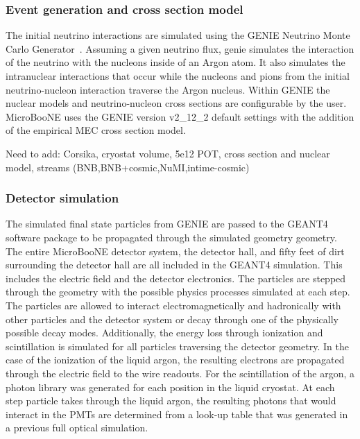   \subsubsection{Event generation and cross section model}
    The initial neutrino interactions are simulated using the GENIE Neutrino
    Monte Carlo Generator~\cite{Andreopoulos:2009rq,Andreopoulos:2015wxa}.
    Assuming a given neutrino flux, genie simulates the interaction of the
    neutrino with the nucleons inside of an Argon atom. It also simulates the
    intranuclear interactions that occur while the nucleons and pions from the
    initial neutrino-nucleon interaction traverse the Argon nucleus.  Within
    GENIE the nuclear models and neutrino-nucleon cross sections are
    configurable by the user.  MicroBooNE uses the GENIE version v2\_12\_2
    default settings with the addition of the empirical MEC cross section model.

    Need to add: Corsika, cryostat volume, 5e12 POT, cross section and nuclear
    model, streams (BNB,BNB+cosmic,NuMI,intime-cosmic)

  \subsubsection{Detector simulation}
    The simulated final state particles from GENIE are passed to the
    GEANT4~\cite{geant4} software package to be propagated through the
    simulated geometry geometry. The entire MicroBooNE detector system, the
    detector hall, and fifty feet of dirt surrounding the detector hall are all
    included in the GEANT4 simulation. This includes the electric field and the
    detector electronics. The particles are stepped through the geometry with
    the possible physics processes simulated at each step. The particles are
    allowed to interact electromagnetically and hadronically with other
    particles and the detector system or decay through one of the physically
    possible decay modes. Additionally, the energy loss through ionization and
    scintillation is simulated for all particles traversing the detector
    geometry. In the case of the ionization of the liquid argon, the resulting
    electrons are propagated through the electric field to the wire readouts.
    For the scintillation of the argon, a photon library was generated for each
    position in the liquid cryostat. At each step particle takes through the
    liquid argon, the resulting photons that would interact in the PMTs are
    determined from a look-up table that was generated in a previous full
    optical simulation. 

